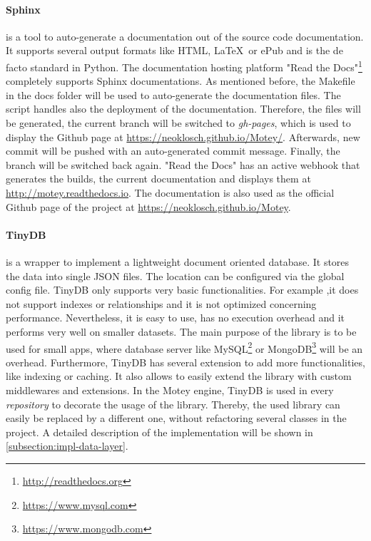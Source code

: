 \paragraph{Sphinx} is a tool to auto-generate a documentation out of the source code documentation.
It supports several output formats like \ac{HTML}, \LaTeX\ or ePub and is the de facto standard in Python.
The documentation hosting platform "Read the Docs"\footnote{\url{http://readthedocs.org}} completely supports Sphinx documentations.
As mentioned before, the Makefile in the docs folder will be used to auto-generate the documentation files.
The script handles also the deployment of the documentation.
Therefore, the files will be generated, the current branch will be switched to \textit{gh-pages}, which is used to display the Github page at \url{https://neoklosch.github.io/Motey/}.
Afterwards, new commit will be pushed with an auto-generated commit message.
Finally, the branch will be switched back again.
"Read the Docs" has an active webhook that generates the builds, the current documentation and displays them at \url{http://motey.readthedocs.io}.
The documentation is also used as the official Github page of the project at \url{https://neoklosch.github.io/Motey}.

\paragraph{TinyDB} is a wrapper to implement a lightweight document oriented database.
It stores the data into single \ac{JSON} files.
The location can be configured via the global config file.
TinyDB only supports very basic functionalities.
For example ,it does not support indexes or relationships and it is not optimized concerning performance.
Nevertheless, it is easy to use, has no execution overhead and it performs very well on smaller datasets.
The main purpose of the library is to be used for small apps, where database server like MySQL\footnote{\url{https://www.mysql.com}} or MongoDB\footnote{\url{https://www.mongodb.com}} will be an overhead.
Furthermore, TinyDB has several extension to add more functionalities, like indexing or caching.
It also allows to easily extend the library with custom middlewares and extensions.
In the Motey engine, TinyDB is used in every \textit{repository} to decorate the usage of the library.
Thereby, the used library can easily be replaced by a different one, without refactoring several classes in the project.
A detailed description of the implementation will be shown in \ref{subsection:impl-data-layer}.

